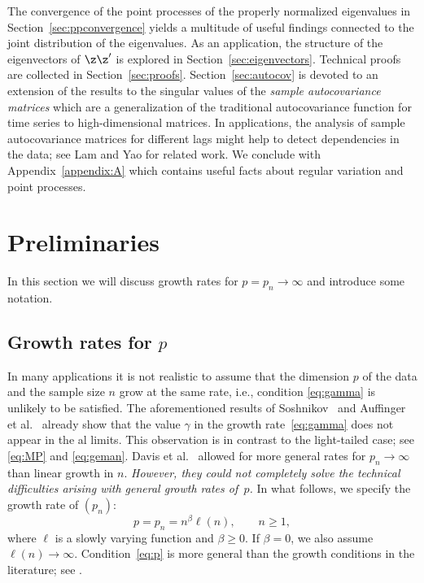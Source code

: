 The convergence of the point processes of the properly normalized eigenvalues in Section~\ref{sec:ppconvergence} yields a multitude of useful findings connected to the joint distribution of the eigenvalues. As an application, the structure of the eigenvectors of $\z\z'$ is explored in Section~\ref{sec:eigenvectors}.
Technical proofs are collected in Section~\ref{sec:proofs}.
Section~\ref{sec:autocov} is devoted to an extension of the results to the singular values of the 
{\em sample autocovariance matrices}  which are a generalization of the traditional autocovariance function for time series to high-dimensional matrices. In applications, the analysis of sample autocovariance matrices for different lags might help to detect dependencies in the data; see Lam and Yao \cite{lam:yao:2012} for related work.
 We conclude with Appendix~\ref{appendix:A} which contains useful facts about regular variation and point processes.





\section{Preliminaries}\label{sec:2}
In this section we will discuss growth rates for $p=p_n\to\infty$ and introduce some notation. 
\subsection{Growth rates for $p$}
In many applications it is not realistic to assume 
that the dimension $p$ of the data and the sample size $n$ grow at the same rate, i.e., condition \eqref{eq:gamma} is unlikely to be
satisfied.
The aforementioned results of Soshnikov~\cite{soshnikov:2004,soshnikov:2006} and Auffinger et al.~\cite{auffinger:arous:peche:2009} already show that the value $\gamma$ in the growth
rate~\eqref{eq:gamma} does not appear in the \ds al limits. 
This observation is in contrast to the light-tailed case; see \eqref{eq:MP} 
and \eqref{eq:geman}.  Davis et al.~\cite{davis:mikosch:pfaffel:2016,davis:pfaffel:stelzer:2014} allowed for more general rates for
$p_n\to\infty$ than linear growth in $n$. {\em However, they could not completely solve the technical difficulties arising with general growth rates of~$p$.}
In what follows, we 
specify the growth rate of $(p_n)$:
\begin{equation}\label{eq:p}
p=p_n=n^\beta \ell(n), \qquad n\ge1,\tag{$C_p(\beta)$}
\end{equation}
where $\ell$ is a slowly varying function and $\beta\ge 0$. If $\beta =0$, we also assume $\ell(n) \to \infty$. 
Condition~\ref{eq:p} is more general than the growth conditions in the literature; see 
\cite{auffinger:arous:peche:2009,davis:mikosch:pfaffel:2016,davis:pfaffel:stelzer:2014}. 

